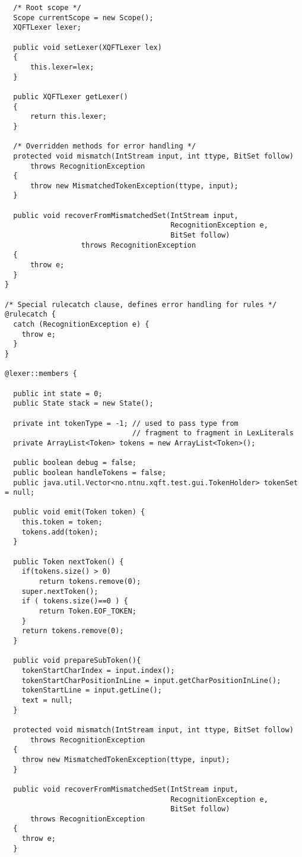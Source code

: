 \begin{verbatim}
  /* Root scope */
  Scope currentScope = new Scope();
  XQFTLexer lexer;
  
  public void setLexer(XQFTLexer lex)
  {
      this.lexer=lex;
  }
  
  public XQFTLexer getLexer()
  {
      return this.lexer;
  }

  /* Overridden methods for error handling */
  protected void mismatch(IntStream input, int ttype, BitSet follow)
      throws RecognitionException
  {
      throw new MismatchedTokenException(ttype, input);
  }

  public void recoverFromMismatchedSet(IntStream input, 
                                       RecognitionException e, 
                                       BitSet follow)
                  throws RecognitionException
  {
      throw e;
  }
}

/* Special rulecatch clause, defines error handling for rules */
@rulecatch {
  catch (RecognitionException e) {
    throw e;
  }
}

@lexer::members {

  public int state = 0;
  public State stack = new State();

  private int tokenType = -1; // used to pass type from 
                              // fragment to fragment in LexLiterals
  private ArrayList<Token> tokens = new ArrayList<Token>();

  public boolean debug = false;
  public boolean handleTokens = false;
  public java.util.Vector<no.ntnu.xqft.test.gui.TokenHolder> tokenSet = null;

  public void emit(Token token) {
    this.token = token;
    tokens.add(token);
  }

  public Token nextToken() {
    if(tokens.size() > 0)
        return tokens.remove(0);
    super.nextToken();
    if ( tokens.size()==0 ) {
        return Token.EOF_TOKEN;
    }
    return tokens.remove(0);
  }

  public void prepareSubToken(){
    tokenStartCharIndex = input.index();
    tokenStartCharPositionInLine = input.getCharPositionInLine();
    tokenStartLine = input.getLine();
    text = null;
  }

  protected void mismatch(IntStream input, int ttype, BitSet follow)
      throws RecognitionException
  {
    throw new MismatchedTokenException(ttype, input);
  }

  public void recoverFromMismatchedSet(IntStream input, 
                                       RecognitionException e,
                                       BitSet follow)
      throws RecognitionException
  {
    throw e;
  }



\end{verbatim}
